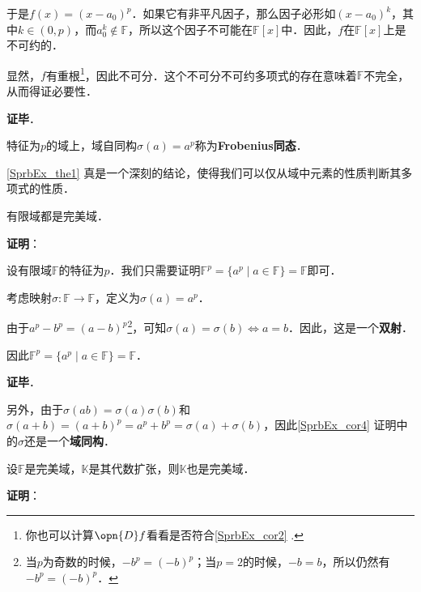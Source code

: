 于是$f(x)=(x-a_0)^p$．如果它有非平凡因子，那么因子必形如$(x-a_0)^k$，其中$k\in(0, p)$，而$a_0^k\not\in\mathbb{F}$，所以这个因子不可能在$\mathbb{F}[x]$中．因此，$f$在$\mathbb{F}[x]$上是不可约的．

显然，$f$有重根\footnote{你也可以计算$\opn{D}f$看看是否符合\autoref{SprbEx_cor2} .}，因此不可分．这个不可分不可约多项式的存在意味着$\mathbb{F}$不完全，从而得证必要性．

\textbf{证毕}．




特征为$p$的域上，域自同构$\sigma(a)=a^p$称为\textbf{Frobenius同态}．


\autoref{SprbEx_the1} 真是一个深刻的结论，使得我们可以仅从域中元素的性质判断其多项式的性质．









\begin{corollary}{}\label{SprbEx_cor4}
有限域都是完美域．
\end{corollary}

\textbf{证明}：

设有限域$\mathbb{F}$的特征为$p$．我们只需要证明$\mathbb{F}^p=\{a^p\mid a\in\mathbb{F}\}=\mathbb{F}$即可．

考虑映射$\sigma:\mathbb{F}\to\mathbb{F}$，定义为$\sigma(a)=a^p$．

由于$a^p-b^p=(a-b)^p$\footnote{当$p$为奇数的时候，$-b^p=(-b)^p$；当$p=2$的时候，$-b=b$，所以仍然有$-b^p=(-b)^p$．}，可知$\sigma(a)=\sigma(b)\iff a=b$．因此，这是一个\textbf{双射}．

因此$\mathbb{F}^p=\{a^p\mid a\in\mathbb{F}\}=\mathbb{F}$．

\textbf{证毕}．

另外，由于$\sigma(ab)=\sigma(a)\sigma(b)$和$\sigma(a+b)=(a+b)^p=a^p+b^p=\sigma(a)+\sigma(b)$，因此\autoref{SprbEx_cor4} 证明中的$\sigma$还是一个\textbf{域同构}．


\begin{corollary}{}\label{SprbEx_cor5}
设$\mathbb{F}$是完美域，$\mathbb{K}$是其代数扩张，则$\mathbb{K}$也是完美域．
\end{corollary}


\textbf{证明}：


